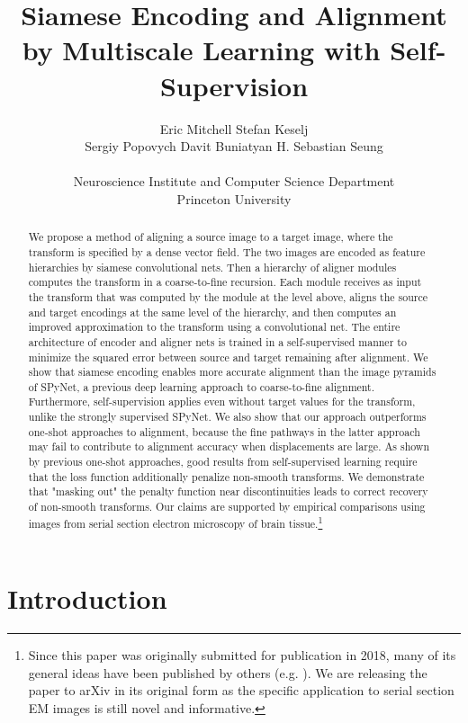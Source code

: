 \documentclass{article}
\title{Siamese Encoding and Alignment by Multiscale Learning with Self-Supervision}
\author{
  Eric Mitchell \qquad Stefan Keselj\\
  Sergiy Popovych \qquad Davit Buniatyan \qquad H. Sebastian Seung\\
  \qquad\\
  Neuroscience Institute and Computer Science Department\\
  Princeton University
}
\begin{document}

\maketitle

\begin{abstract}
We propose a method of aligning a source image to a target image,
where the transform is specified by a dense vector field. The two
images are encoded as feature hierarchies by siamese convolutional nets. Then a hierarchy of aligner modules computes the transform in a coarse-to-fine recursion. Each module receives as input the transform that was computed by the module at the level above, aligns the source and target encodings at the same level of the hierarchy, and then computes an improved approximation to the transform using a convolutional net. The entire architecture of encoder and aligner nets is trained in a self-supervised manner to minimize the squared error between source and target remaining after alignment. We show that siamese encoding enables more accurate
alignment than the image pyramids of SPyNet, a previous deep learning
approach to coarse-to-fine alignment. Furthermore, self-supervision applies even without target values for the transform, unlike the strongly supervised SPyNet. We also show that our approach outperforms one-shot approaches to alignment, because the fine pathways in the latter approach may fail to contribute to
alignment accuracy when displacements are large. As shown by previous one-shot approaches, good results from self-supervised learning require that the loss function additionally penalize non-smooth transforms. We demonstrate that
"masking out" the penalty function near discontinuities leads to
correct recovery of non-smooth transforms. Our claims are supported by empirical comparisons using images from serial section electron microscopy of brain tissue.\footnote{Since this paper was originally submitted for publication in 2018, many of its general ideas have been published by others (e.g. \citet{hui2018liteflownet}). We are releasing the paper to arXiv in its original form as the specific application to serial section EM images is still novel and informative.}
\end{abstract}

\section{Introduction}
\end{document}
